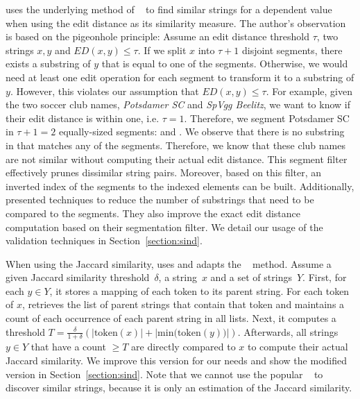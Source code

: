 \sawfish uses the underlying method of ~\cite{PassJoin} to find similar strings for a dependent value when using the edit distance as its similarity measure.
The author's observation is based on the pigeonhole principle: Assume an edit distance threshold $\tau$, two strings $x,y$ and $ED(x,y) \leq \tau$. 
If we split $x$ into $\tau + 1$ disjoint segments, there exists a substring of $y$ that is equal to one of the segments.
Otherwise, we would need at least one edit operation for each segment to transform it to a substring of $y$.
However, this violates our assumption that $ED(x,y) \leq \tau$.
For example, given the two soccer club names, \emph{Potsdamer SC} and \emph{SpVgg Beelitz}, we want to know if their edit distance is within one, i.e. $\tau = 1$.
Therefore, we segment Potsdamer SC in $\tau + 1 = 2$ equally-sized segments:  and .
We observe that there is no substring in  that matches any of the segments.
Therefore, we know that these club names are not similar without computing their actual edit distance.
This segment filter effectively prunes dissimilar string pairs.
Moreover, based on this filter, an inverted index of the segments to the indexed elements can be built.
Additionally, \citeauthor{PassJoin} presented techniques to reduce the number of substrings that need to be compared to the segments.
They also improve the exact edit distance computation based on their segmentation filter.
We detail our usage of the validation techniques in Section~\ref{section:sind}.

When using the Jaccard similarity, \sawfish uses and adapts the ~\cite{StringSimSurvey} method.
Assume a given Jaccard similarity threshold~$\delta$, a string~$x$ and a set of strings~$Y$.
First, for each $y \in Y$, it stores a mapping of each token to its parent string.
For each token of $x$,  retrieves the list of parent strings that contain that token and maintains a count of each occurrence of each parent string in all lists.
Next, it computes a threshold $T = \frac{\delta}{1+\delta}(|\text{token}(x)| + |\text{min(token}(y))|)$.
Afterwards, all strings $y \in Y$ that have a count $\geq T$ are directly compared to $x$ to compute their actual Jaccard similarity.
We improve this version for our needs and show the modified version in Section~\ref{section:sind}.
Note that we cannot use the popular ~\cite{Wu2022MinHash} to discover similar strings, because it is only an estimation of the Jaccard similarity.
